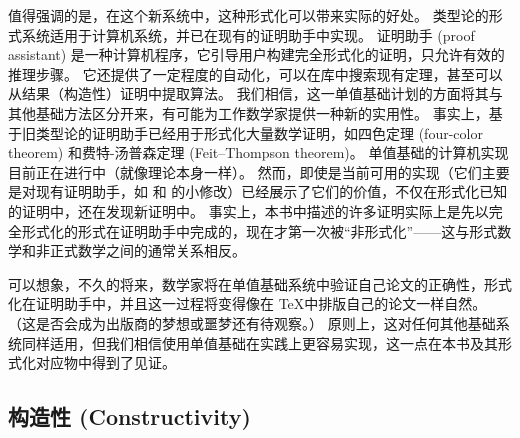 值得强调的是，在这个新系统中，这种形式化可以带来实际的好处。
类型论的形式系统适用于计算机系统，并已在现有的证明助手中实现。
证明助手 (proof assistant) 是一种计算机程序，它引导用户构建完全形式化的证明，只允许有效的推理步骤。
它还提供了一定程度的自动化，可以在库中搜索现有定理，甚至可以从结果（构造性）证明中提取算法。
我们相信，这一单值基础计划的方面将其与其他基础方法区分开来，有可能为工作数学家提供一种新的实用性。
事实上，基于旧类型论的证明助手已经用于形式化大量数学证明，如四色定理 (four-color theorem) 和费特-汤普森定理 (Feit--Thompson theorem)。
单值基础的计算机实现目前正在进行中（就像理论本身一样）。
然而，即使是当前可用的实现（它们主要是对现有证明助手，如 \Coq 和 \Agda 的小修改）已经展示了它们的价值，不仅在形式化已知的证明中，还在发现新证明中。
事实上，本书中描述的许多证明实际上是先以完全形式化的形式在证明助手中完成的，现在才第一次被“非形式化”——这与形式数学和非正式数学之间的通常关系相反。

可以想象，不久的将来，数学家将在单值基础系统中验证自己论文的正确性，形式化在证明助手中，并且这一过程将变得像在 \TeX 中排版自己的论文一样自然。
（这是否会成为出版商的梦想或噩梦还有待观察。）
原则上，这对任何其他基础系统同样适用，但我们相信使用单值基础在实践上更容易实现，这一点在本书及其形式化对应物中得到了见证。

%

\subsection*{构造性 (Constructivity)}

%

